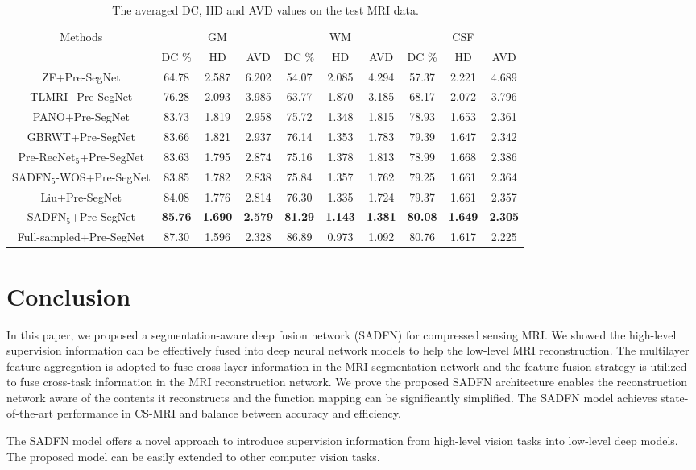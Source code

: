 \documentclass[runningheads]{llncs}
\begin{document}
\begin{table}[]
\centering
\scriptsize
\caption{The averaged DC, HD and AVD values on the test MRI data.}
\label{SegPerf}
\begin{tabular}{|c|c|c|c|c|c|c|c|c|c|}
\hline
\multirow{2}{*}{Methods} & \multicolumn{3}{c|}{GM}  & \multicolumn{3}{c|}{WM}  & \multicolumn{3}{c|}{CSF} \\ \cline{2-10}
                         & DC \%   & HD     & AVD    & DC \%  & HD     & AVD    & DC \%  & HD     & AVD    \\ \hline
ZF+Pre-SegNet                & 64.78 & 2.587 & 6.202 & 54.07 & 2.085 & 4.294 & 57.37 & 2.221 & 4.689 \\ \hline
TLMRI+Pre-SegNet             & 76.28 & 2.093 & 3.985 & 63.77 & 1.870 & 3.185 & 68.17 & 2.072 & 3.796 \\ \hline
PANO+Pre-SegNet              & 83.73 & 1.819 & 2.958 & 75.72 & 1.348 & 1.815 & 78.93 & 1.653 & 2.361 \\ \hline
GBRWT+Pre-SegNet             & 83.66 & 1.821 & 2.937 & 76.14 & 1.353 & 1.783 & 79.39 & 1.647 & 2.342 \\ \hline
Pre-RecNet$_5$+Pre-SegNet        & 83.63 & 1.795 & 2.874 & 75.16 & 1.378 & 1.813 & 78.99 & 1.668 & 2.386 \\ \hline
SADFN$_5$-WOS+Pre-SegNet     & 83.85 & 1.782 & 2.838 & 75.84 & 1.357 & 1.762 & 79.25 & 1.661 & 2.364 \\ \hline
Liu\cite{27}+Pre-SegNet      & 84.08 & 1.776 & 2.814 & 76.30 & 1.335 & 1.724 & 79.37 & 1.661 & 2.357 \\ \hline
SADFN$_5$+Pre-SegNet         & \textbf{85.76} & \textbf{1.690} & \textbf{2.579} & \textbf{81.29} & \textbf{1.143} & \textbf{1.381} & \textbf{80.08} & \textbf{1.649} & \textbf{2.305} \\ \hline
Full-sampled+Pre-SegNet                & 87.30 & 1.596 & 2.328 & 86.89 & 0.973 & 1.092 & 80.76 & 1.617 & 2.225 \\ \hline
\end{tabular}
\end{table}

\section{Conclusion}

In this paper, we proposed a segmentation-aware deep fusion network (SADFN) for compressed sensing MRI. We showed the high-level supervision information can be effectively fused into deep neural network models to help the low-level MRI reconstruction. The multilayer feature aggregation is adopted to fuse cross-layer information in the MRI segmentation network and the feature fusion strategy is utilized to fuse cross-task information in the MRI reconstruction network. We prove the proposed SADFN architecture enables the reconstruction network aware of the contents it reconstructs and the function mapping can be significantly simplified. The SADFN model achieves state-of-the-art performance in CS-MRI and balance between accuracy and efficiency.

The SADFN model offers a novel approach to introduce supervision information from high-level vision tasks into low-level deep models. The proposed model can be easily extended to other computer vision tasks.






\end{document}
